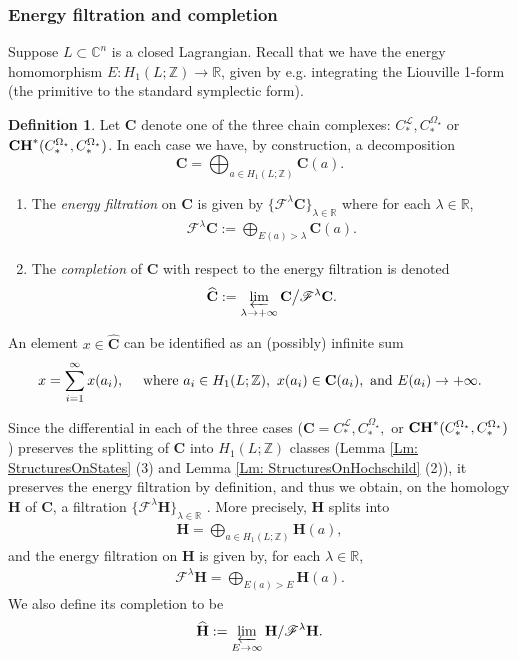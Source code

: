 \documentclass[10pt]{amsart}
\numberwithin{equation}{section}
\theoremstyle{plain}
\theoremstyle{definition}
\newtheorem{definition}[theorem]{Definition}
\theoremstyle{remark}
\numberwithin{equation}{section}
\newcommand{\R}{\mathbb{R}}
\newcommand{\Z}{\mathbb{Z}}
\newcommand{\C}{\mathbb{C}}
\newcommand{\wh}[1]{\widehat{#1}}
\newcommand{\ms}[1]{\mathscr{#1}}
\newcommand{\CC}{\textbf{\textup{CH}}}
\newcommand{\CFr}{C_*^\mathscr{L}}
\newcommand{\CBa}{C_*^{\Omega_\star}}
\begin{document}
{\subsubsection{Energy filtration and completion}
Suppose $L\subset \C^n$ is a closed Lagrangian. Recall that we have the energy homomorphism $E\colon H_1(L;\Z)\to \R$, given by e.g. integrating the Liouville 1-form (the primitive to the standard symplectic form).

\begin{definition}
Let $\textbf{C}$ denote one of the three chain complexes: $\CFr,\CBa$ or $\CC^*(\CBa,\CBa)$. In each case we have, by construction, a decomposition \[ \textbf{C}= \bigoplus_{a\in H_1(L;\Z)} \textbf{C}(a). \] 

\begin{enumerate}
	\item 	The \emph{energy filtration} on $\textbf{C}$ is given by $\{\mathscr{F}^\lambda \textbf{C}\}_{\lambda\in \R}$ where for each $\lambda \in \R$,
	\begin{align*}
		\ms{F}^\lambda \textbf{C}:= \bigoplus_{E(a)>\lambda} \textbf{C}(a).
	\end{align*}
	\item 	The \emph{completion} of $\textbf{C}$ with respect to the energy filtration is denoted
\[
	\wh{\textbf{C}}:= \varprojlim_{\lambda \to+\infty} \textbf{C}\big /\ms{F}^\lambda \textbf{C}.
\]
\end{enumerate}
\end{definition}

An element $x\in \wh{\textbf{C}}$ can be identified as an (possibly) infinite sum \[ x = \sum_{i=1}^\infty x(a_i), \quad  \textup{ where }a_i \in H_1(L;\Z), \,\, x(a_i) \in \textbf{C}(a_i), \textup{ and } E(a_i)\to +\infty.\]


Since the differential in each of the three cases ($\textbf{C}= \CFr,\CBa,$ or $\CC^*(\CBa,\CBa)$) preserves the splitting of $\textbf{C}$ into $H_1(L;\Z)$ classes (Lemma \ref{Lm: StructuresOnStates} (3) and Lemma \ref{Lm: StructuresOnHochschild} (2)), it preserves the energy filtration by definition, and thus we obtain, on the homology $\textbf{H}$ of $\textbf{C}$, a filtration $\{\ms{F}^\lambda \textbf{H}\}_{\lambda \in \R}$ . More precisely, $\textbf{H}$ splits into
\begin{align*}
	\textbf{H} = \bigoplus_{a \in H_1(L;\Z)} \textbf{H}(a),
\end{align*}
and the energy filtration on $\textbf{H}$ is given by, for each $\lambda \in \R$,
\begin{align*}
	\ms{F}^\lambda \textbf{H} = \bigoplus_{E(a)>E} \textbf{H}(a).
\end{align*}
We also define its completion to be 
\begin{align*}
	\wh{\textbf{H}}:=  \varprojlim_{E\to\infty} \textbf{H}/\ms{F}^\lambda \textbf{H}.
\end{align*}



}
\end{document}
